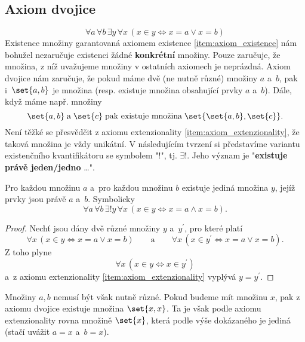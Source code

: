 \subsection{Axiom dvojice}
\begin{equation*}
    \forall a\,\forall b\,\exists y\,\forall x\,(x \in y \iff x=a \lor x=b)
\end{equation*}
Existence množiny garantovaná axiomem existence \ref{item:axiom_existence} nám bohužel nezaručuje existenci žádné \textbf{konkrétní} množiny. Pouze zaručuje, že množina, z níž uvažujeme množiny v ostatních axiomech je neprázdná. Axiom dvojice nám zaručuje, že pokud máme dvě (ne nutně různé) množiny $a$ a~$b$, pak i~$\set{a,b}$ je množina (resp. existuje množina obsahující prvky $a$ a~$b$). Dále, když máme např. množiny
\begin{equation*}
    \set{a,b}\;\text{a}\;\set{c}\;\text{pak existuje množina}\;\set{\set{a,b},\set{c}}.
\end{equation*}
Není těžké se přesvědčit z axiomu extenzionality \ref{item:axiom_extenzionality}, že taková množina je vždy unikátní. V následujícím tvrzení si představíme variantu existenčního kvantifikátoru se symbolem "$!$", tj. $\exists!$. Jeho význam je "\textbf{existuje právě jeden/jedno} \dots".
\begin{lemma}\label{lem:univerzalnost_neusp_dvojic}
    Pro každou množinu $a$ a~pro každou množinu $b$ existuje jediná množina $y$, jejíž prvky jsou právě $a$ a~$b$. Symbolicky
    \begin{equation*}
        \forall a\,\forall b\,\exists!y\,\forall x\,(x \in y \iff x=a \land x=b).
    \end{equation*}
\end{lemma}
\begin{proof}
    Nechť jsou dány dvě různé množiny $y$ a~$y^\prime$, pro které platí
    \begin{equation*}
        \forall x\,(x\in y \iff x=a \lor x=b)\qquad \text{a}\qquad\forall x\, (x\in y^\prime \iff x=a \lor x=b).
    \end{equation*}
    Z toho plyne
    \begin{equation*}
        \forall x\,(x\in y \iff x\in y^\prime)
    \end{equation*}
    a~z axiomu extenzionality \ref{item:axiom_extenzionality} vyplývá $y=y^\prime$.
\end{proof}
Množiny $a,b$ nemusí být však nutně různé. Pokud budeme mít množinu $x$, pak z axiomu dvojice existuje množina $\set{x,x}$. Ta je však podle axiomu extenzionality rovna množině $\set{x}$, která podle výše dokázaného je jediná (stačí uvážit $a=x$ a~$b=x$).
